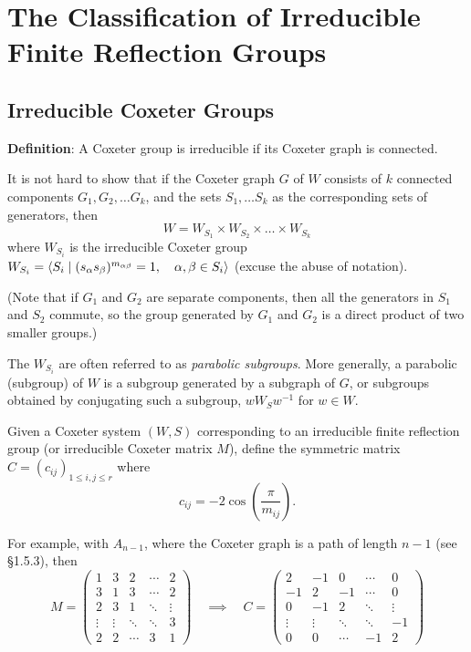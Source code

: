 \chapter{The Classification of Irreducible Finite Reflection Groups}

\section{Irreducible Coxeter Groups}

{\bf Definition}: A Coxeter group is irreducible if its Coxeter graph is
connected.

It is not hard to show that if the Coxeter graph $G$ of $W$ consists of $k$
connected components $G_1, G_2, \dots G_k$, and the sets $S_1, \dots S_k$ as
the corresponding sets of generators, then
\[
    W = W_{S_1} \times W_{S_2} \times \dots \times W_{S_k}
\]
where $W_{S_i}$ is the irreducible Coxeter group $W_{S_i} = \langle S_i \mid
(s_\alpha s_\beta)^{m_{\alpha \beta}} = 1, \quad \alpha, \beta \in S_i \rangle$
(excuse the abuse of notation).

(Note that if $G_1$ and $G_2$ are separate components, then all the generators
in $S_1$ and $S_2$ commute, so the group generated by $G_1$ and $G_2$ is a
direct product of two smaller groups.)

The $W_{S_i}$ are often referred to as {\em parabolic subgroups}. More generally,
a parabolic (subgroup) of $W$ is a subgroup generated by a subgraph of $G$, or
subgroups obtained by conjugating such a subgroup, $w W_S w^{-1}$ for $w \in W$.

Given a Coxeter system $(W, S)$ corresponding to an irreducible finite reflection
group (or irreducible Coxeter matrix $M$), define the symmetric matrix
$C = (c_{ij})_{1 \leq i,j \leq r}$ where
\[
    c_{ij} = -2 \cos \left(\frac{\pi}{m_{ij}} \right).
\]

For example, with $A_{n-1}$, where the Coxeter graph is a path of length $n-1$
(see \S 1.5.3), then
\[
    M = \begin{pmatrix}
        1 & 3 & 2 & \cdots & 2 \\
        3 & 1 & 3 & \cdots & 2 \\
        2 & 3 & 1 & \ddots & \vdots \\
        \vdots & \vdots & \ddots & \ddots & 3 \\
        2 & 2 & \cdots & 3 & 1
    \end{pmatrix}
    \quad \implies \quad
    C = \begin{pmatrix}
        2 & -1 & 0 & \cdots & 0 \\
        -1 & 2 & -1 & \cdots & 0 \\
        0 & -1 & 2 & \ddots & \vdots \\
        \vdots & \vdots & \ddots & \ddots & -1 \\
        0 & 0 & \cdots & -1 & 2
    \end{pmatrix}
\]
